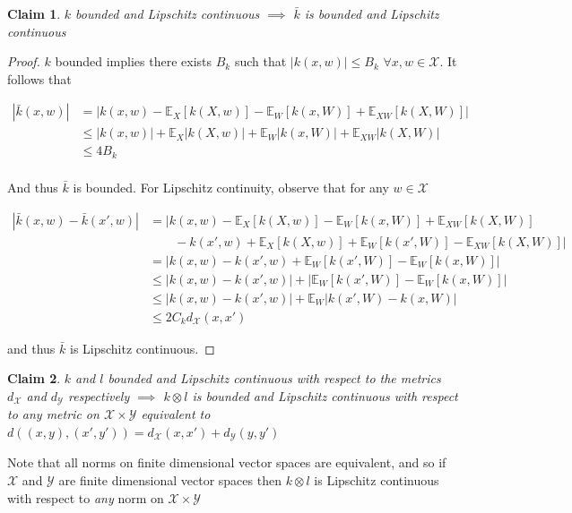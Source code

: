 \documentclass[]{article}
\newtheorem{claim}{Claim}
\begin{document}
\begin{claim}
$k$ bounded and Lipschitz continuous $\implies$ $\bar{k}$ is bounded and Lipschitz continuous
\end{claim}
\begin{proof}
$k$ bounded implies there exists $B_k$ such that $|k(x,w)|\leq B_k$ $\forall x, w \in \mathcal{X}$. It follows that

\begin{align*}
|\bar{k}(x,w)| & = |k(x,w) - \mathbb{E}_X[k(X,w)] - \mathbb{E}_W[k(x,W)] + \mathbb{E}_{XW}[k(X,W)]| \\
& \leq |k(x,w)|  + \mathbb{E}_X |k(X,w)| + \mathbb{E}_W|k(x,W)| + \mathbb{E}_{XW}|k(X,W)| \\
& \leq 4B_k \\
\end{align*}

And thus $\bar{k}$ is bounded. For Lipschitz continuity, observe that for any $w \in \mathcal{X}$

\begin{align*}
|\bar{k}(x,w) - \bar{k}(x',w)| & = |k(x,w) - \mathbb{E}_X[k(X,w)] - \mathbb{E}_W[k(x,W)] + \mathbb{E}_{XW}[k(X,W)] \\
& \quad \quad - k(x',w) + \mathbb{E}_X[k(X,w)] + \mathbb{E}_W[k(x',W)] - \mathbb{E}_{XW}[k(X,W)] |\\
& = |k(x,w)- k(x',w)  + \mathbb{E}_W[k(x',W)] - \mathbb{E}_W[k(x,W)] |\\
&\leq |k(x,w)- k(x',w)| + |\mathbb{E}_W[k(x',W)] - \mathbb{E}_W[k(x,W)] | \\
&\leq|k(x,w)- k(x',w)| + \mathbb{E}_W|k(x',W) - k(x,W) | \\
&\leq 2C_k d_\mathcal{X}(x,x')
\end{align*}

and thus $\bar{k}$ is Lipschitz continuous.

\end{proof}

\begin{claim}
$k$ and $l$ bounded and Lipschitz continuous with respect to the metrics $d_\mathcal{X}$ and $d_\mathcal{Y}$ respectively $\implies$ $k\otimes l$ is bounded and Lipschitz continuous with respect to any metric on $\mathcal{X}\times \mathcal{Y}$ equivalent to $d \left( (x,y),(x',y') \right) =  d_\mathcal{X}(x,x') + d_\mathcal{Y}(y,y')$
\end{claim}

Note that all norms on finite dimensional vector spaces are equivalent, and so if $\mathcal{X}$ and $\mathcal{Y}$ are finite dimensional vector spaces then $k\otimes l$ is Lipschitz continuous with respect to \emph{any} norm on $\mathcal{X}\times \mathcal{Y}$
\end{document}
